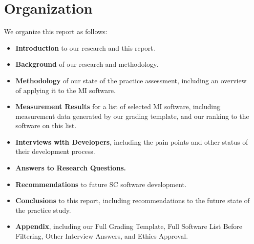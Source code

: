 \section{Organization}
We organize this report as follows:
\begin{itemize}
\item \textbf{Introduction} to our research and this report.
\item \textbf{Background} of our research and methodology.
\item \textbf{Methodology} of our state of the practice assessment, including an overview of applying it to the MI software.
\item \textbf{Measurement Results} for a list of selected MI software, including measurement data generated by our grading template, and our ranking to the software on this list.
\item \textbf{Interviews with Developers}, including the pain points and other status of their development process.
\item \textbf{Answers to Research Questions.} 
\item \textbf{Recommendations} to future SC software development.
\item \textbf{Conclusions} to this report, including recommendations to the future state of the practice study.
\item \textbf{Appendix}, including our Full Grading Template, Full Software List Before Filtering, Other Interview Answers, and Ethics Approval.
\end{itemize}
